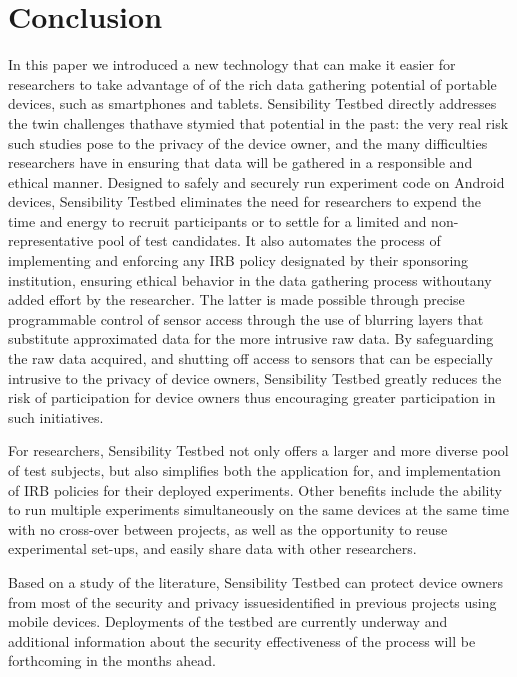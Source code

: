 \section{Conclusion}\label{sec-conclude}

In this paper we introduced a new technology that can make it easier for 
researchers to take advantage of of the rich data gathering potential of 
portable devices, such as smartphones and tablets. Sensibility Testbed
directly addresses the twin challenges thathave stymied that potential in
the past: the very real risk such studies pose to the privacy
of the device owner, and the many difficulties researchers have in 
ensuring that data will be gathered in a responsible and ethical manner.
Designed to safely and securely run experiment code on Android devices,
Sensibility Testbed  eliminates the need for researchers to 
expend the time and energy to recruit participants or to settle
for a limited and non-representative pool of test candidates. It also automates
the process of implementing and enforcing any IRB policy designated by
their sponsoring institution, ensuring ethical behavior in the data 
gathering process withoutany added effort by the researcher. The latter is made possible
through precise programmable control of sensor access through the use of blurring
layers that substitute approximated data for the more intrusive raw data. By 
safeguarding the raw data acquired, and shutting off access to sensors that can
be especially intrusive to the privacy of device owners, Sensibility Testbed
greatly reduces the risk of participation for device owners thus encouraging greater
participation in such initiatives.

For researchers, Sensibility Testbed not only offers a larger and more diverse pool
of test subjects, but also simplifies both the application for, and implementation
of IRB policies for their deployed experiments. Other benefits include the ability to
run multiple experiments simultaneously on the same devices
at the same time with no cross-over between projects, as well as the opportunity to 
reuse experimental set-ups, and easily share data with other researchers.
 
 Based on a study of the literature, Sensibility Testbed can protect device owners
 from most of the security and privacy issuesidentified in previous projects
 using mobile devices. Deployments of the testbed are currently underway and
 additional information about the security effectiveness of the process will
 be forthcoming in the months ahead.
 

